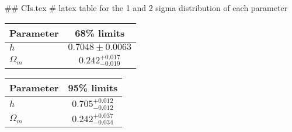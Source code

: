 ## CIs.tex
# latex table for the 1 and 2 sigma distribution of each parameter

\begin{tabular} { l  c}
 Parameter &  68\% limits\\
\hline
{\boldmath$h              $} & $0.7048\pm 0.0063          $\\
{\boldmath$\Omega_m       $} & $0.242^{+0.017}_{-0.019}   $\\
\hline
\end{tabular}

\begin{tabular} { l  c}
 Parameter &  95\% limits\\
\hline
{\boldmath$h              $} & $0.705^{+0.012}_{-0.012}   $\\
{\boldmath$\Omega_m       $} & $0.242^{+0.037}_{-0.034}   $\\
\hline
\end{tabular}
